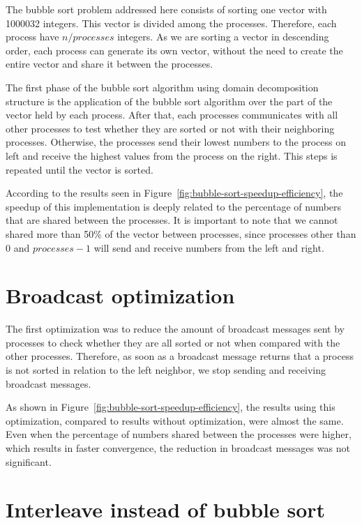 \documentclass[10pt,twocolumn]{article}
\begin{document}
The bubble sort problem addressed here consists of sorting one vector with 1000032 integers. This vector is divided among the processes. Therefore, each process have $n/processes$ integers. As we are sorting a vector in descending order, each process can generate its own vector, without the need to create the entire vector and share it between the processes.

The first phase of the bubble sort algorithm using domain decomposition structure is the application of the bubble sort algorithm over the part of the vector held by each process. After that, each processes communicates with all other processes to test whether they are sorted or not with their neighboring processes. Otherwise, the processes send their lowest numbers to the process on left and receive the highest values from the process on the right. This steps is repeated until the vector is sorted.

According to the results seen in Figure~\ref{fig:bubble-sort-speedup-efficiency}, the speedup of this implementation is deeply related to the percentage of numbers that are shared between the processes. It is important to note that we cannot shared more than 50\% of the vector between processes, since processes other than $0$ and $processes - 1$ will send and receive numbers from the left and right.


\section*{Broadcast optimization}

The first optimization was to reduce the amount of broadcast messages sent by processes to check whether they are all sorted or not when compared with the other processes. Therefore, as soon as a broadcast message returns that a process is not sorted in relation to the left neighbor, we stop sending and receiving broadcast messages.

As shown in Figure~\ref{fig:bubble-sort-speedup-efficiency}, the results using this optimization, compared to results without optimization, were almost the same. Even when the percentage of numbers shared between the processes were higher, which results in faster convergence, the reduction in broadcast messages was not significant.


\section*{Interleave instead of bubble sort}
\end{document}
